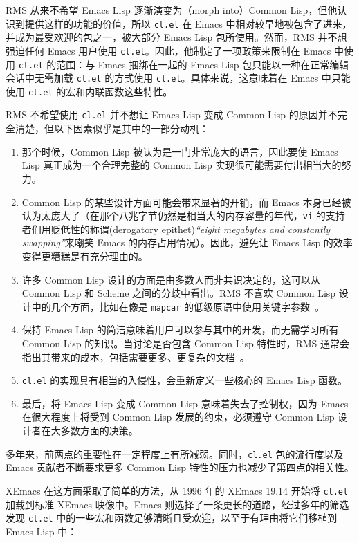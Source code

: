 \documentclass[format=acmsmall,screen]{acmart}
\begin{document}
RMS 从来不希望 Emacs Lisp 逐渐演变为（morph into）Common Lisp，但他认识到提供这样的功能的价值，所以 \texttt{cl.el} 在 Emacs 中相对较早地被包含了进来，并成为最受欢迎的包之一，被大部分 Emacs Lisp 包所使用。然而，RMS 并不想强迫任何 Emacs 用户使用 \texttt{cl.el}。因此，他制定了一项政策来限制在 Emacs 中使用 \texttt{cl.el} 的范围：与 Emacs 捆绑在一起的 Emacs Lisp 包只能以一种在正常编辑会话中无需加载 \texttt{cl.el} 的方式使用 \texttt{cl.el}。具体来说，这意味着在 Emacs 中只能使用 \texttt{cl.el} 的宏和内联函数这些特性。

RMS 不希望使用 \texttt{cl.el} 并不想让 Emacs Lisp 变成 Common Lisp 的原因并不完全清楚，但以下因素似乎是其中的一部分动机：
\begin{enumerate}
\item 那个时候，Common Lisp 被认为是一门非常庞大的语言，因此要使 Emacs Lisp 真正成为一个合理完整的 Common Lisp 实现很可能需要付出相当大的努力。
\item Common Lisp 的某些设计方面可能会带来显著的开销，而 Emacs 本身已经被认为太庞大了（在那个八兆字节仍然是相当大的内存容量的年代，\texttt{vi} 的支持者们用贬低性的称谓(derogatory epithet)\emph{“eight megabytes and constantly swapping”}来嘲笑 Emacs 的内存占用情况）。因此，避免让 Emacs Lisp 的效率变得更糟糕是有充分理由的。
\item 许多 Common Lisp 设计的方面是由多数人而非共识决定的，这可以从 Common Lisp 和 Scheme 之间的分歧中看出。RMS 不喜欢 Common Lisp 设计中的几个方面，比如在像是 \texttt{mapcar} 的低级原语中使用关键字参数~\cite{RMS-keyword-args-are-clunky}。
\item 保持 Emacs Lisp 的简洁意味着用户可以参与其中的开发，而无需学习所有 Common Lisp 的知识。当讨论是否包含 Common Lisp 特性时，RMS 通常会指出其带来的成本，包括需要更多、更复杂的文档~\cite{RMS-cl-big-doc}。
\item \texttt{cl.el} 的实现具有相当的入侵性，会重新定义一些核心的 Emacs Lisp 函数。
\item 最后，将 Emacs Lisp 变成 Common Lisp 意味着失去了控制权，因为 Emacs 在很大程度上将受到 Common Lisp 发展的约束，必须遵守 Common Lisp 设计者在大多数方面的决策。
\end{enumerate}

多年来，前两点的重要性在一定程度上有所减弱。同时，\texttt{cl.el} 包的流行度以及 Emacs 贡献者不断要求更多 Common Lisp 特性的压力也减少了第四点的相关性。

XEmacs 在这方面采取了简单的方法，从 1996 年的 XEmacs 19.14 开始将 \texttt{cl.el} 加载到标准 XEmacs 映像中。Emacs 则选择了一条更长的道路，经过多年的筛选发现 \texttt{cl.el} 中的一些宏和函数足够清晰且受欢迎，以至于有理由将它们移植到 Emacs Lisp 中：
\end{document}
